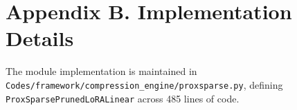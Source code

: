 \section*{Appendix B. Implementation Details}
The module implementation is maintained in \texttt{Codes/framework/compression\_engine/proxsparse.py}, defining \texttt{ProxSparsePrunedLoRALinear} across 485 lines of code.
